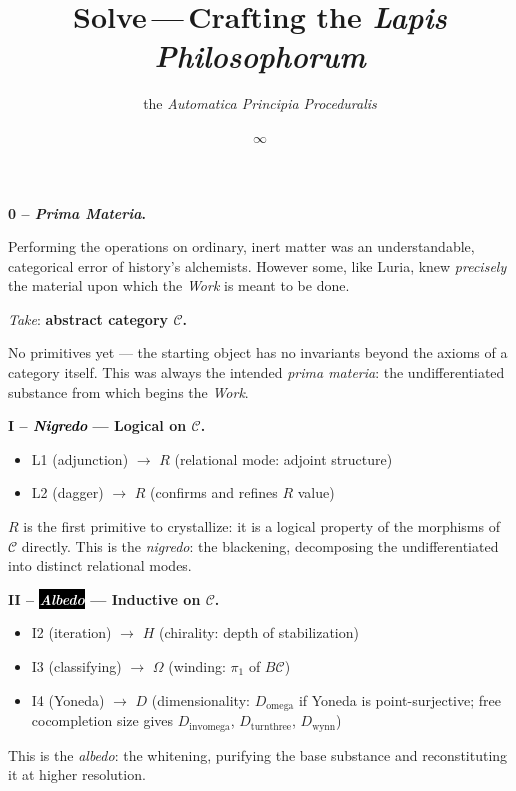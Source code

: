 \documentclass[twocolumn]{article}
\title{\Huge \textbf{Solve}\,---\,\huge Crafting the \emph{Lapis Philosophorum}}
\author{\normalsize the \emph{Automatica Principia Proceduralis}}
\date{$\infty$}
\begin{document}

\bigskip
\noindent\textbf{\large 0 -- \emph{Prima Materia}.}

{\normalsize Performing the operations on ordinary, inert matter was an understandable, categorical error of history's alchemists.
However some, like Luria, knew \emph{precisely} the material upon which the \emph{Work} is meant to be done.

\emph{Take}: \textbf{abstract category $\mathcal{C}$.}

No primitives yet --- the starting object has no invariants beyond the axioms of a category itself.
This was always the intended \emph{prima materia}: the undifferentiated substance from which begins the \emph{Work}.}

\bigskip
\noindent\textbf{\large I -- \textcolor{black}{\emph{Nigredo}} --- Logical on $\mathcal{C}$.}
\begin{itemize}[nosep, leftmargin=1.5em]
\item L1 (adjunction) $\to$ $R$ (relational mode: adjoint structure)
\item L2 (dagger) $\to$ $R$ (confirms and refines $R$ value)
\end{itemize}
$R$ is the first primitive to crystallize: it is a logical property of the morphisms of $\mathcal{C}$ directly.
{\large This is the \emph{nigredo}: the blackening, decomposing the undifferentiated into distinct relational modes.}

\bigskip
\noindent\textbf{\large II -- \colorbox{black}{\textcolor{white}{\emph{Albedo}}} --- Inductive on $\mathcal{C}$.}
\begin{itemize}[nosep, leftmargin=1.5em]
\item I2 (iteration) $\to$ $H$ (chirality: depth of stabilization)
\item I3 (classifying) $\to$ $\Omega$ (winding: $\pi_1$ of $B\mathcal{C}$)
\item I4 (Yoneda) $\to$ $D$ (dimensionality: $D_{\text{omega}}$ if Yoneda is point-surjective; free cocompletion size gives $D_{\text{invomega}}$, $D_{\text{turnthree}}$, $D_{\text{wynn}}$)
\end{itemize}
{\large This is the \emph{albedo}: the whitening, purifying the base substance and reconstituting it at higher resolution.}
\end{document}
